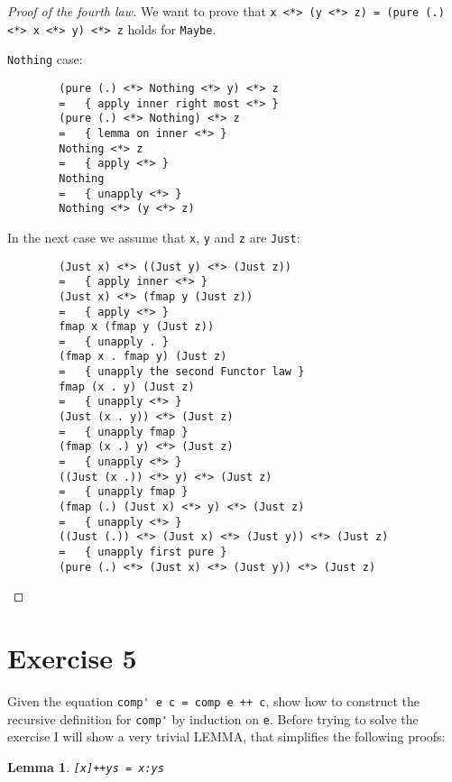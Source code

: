 \documentclass[a4paper]{scrartcl}
\newtheorem{lem}{Lemma}
\newcommand{\haskellCode}[1]{\lstinline|#1|}
\begin{document}
\begin{proof}[Proof of the fourth law]
	We want to prove that \verb|x <*> (y <*> z) = (pure (.) <*> x <*> y) <*> z| holds for \verb|Maybe|.
	
	\verb|Nothing| case:
	
	\begin{verbatim}
		(pure (.) <*> Nothing <*> y) <*> z
		=   { apply inner right most <*> }
		(pure (.) <*> Nothing) <*> z
		=   { lemma on inner <*> }
		Nothing <*> z
		=   { apply <*> }
		Nothing
		=   { unapply <*> }
		Nothing <*> (y <*> z)
	\end{verbatim}
	
	In the next case we assume that \verb|x|, \verb|y| and \verb|z| are \verb|Just|:
	
	\begin{verbatim}
		(Just x) <*> ((Just y) <*> (Just z))
		=   { apply inner <*> }
		(Just x) <*> (fmap y (Just z))
		=   { apply <*> }
		fmap x (fmap y (Just z))
		=   { unapply . }
		(fmap x . fmap y) (Just z)
		=   { unapply the second Functor law }
		fmap (x . y) (Just z)
		=   { unapply <*> }
		(Just (x . y)) <*> (Just z)
		=   { unapply fmap }
		(fmap (x .) y) <*> (Just z)
		=   { unapply <*> }
		((Just (x .)) <*> y) <*> (Just z)
		=   { unapply fmap }
		(fmap (.) (Just x) <*> y) <*> (Just z)
		=   { unapply <*> }
		((Just (.)) <*> (Just x) <*> (Just y)) <*> (Just z)
		=   { unapply first pure }
		(pure (.) <*> (Just x) <*> (Just y)) <*> (Just z)
	\end{verbatim}
\end{proof}



\section*{Exercise 5}
Given the equation \haskellCode{comp' e c = comp e ++ c}, show how to construct the recursive definition
for \haskellCode{comp'} by induction on \haskellCode{e}.
Before trying to solve the exercise I will show a very trivial LEMMA, that simplifies the following proofs:
\begin{lem}
	\label{lem:trivial}
	\haskellCode{[x]++ys = x:ys}
\end{lem}
\end{document}
